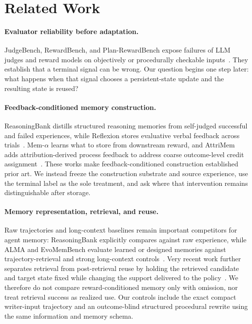 \section{Related Work}
\paragraph{Evaluator reliability before adaptation.}
JudgeBench, RewardBench, and Plan-RewardBench expose failures of LLM judges and reward models on objectively or procedurally checkable inputs~\citep{tan2025judgebench,lambert2024rewardbench,wang2026planrewardbench}. They establish that a terminal signal can be wrong. Our question begins one step later: what happens when that signal chooses a persistent-state update and the resulting state is reused?

\paragraph{Feedback-conditioned memory construction.}
ReasoningBank distills structured reasoning memories from self-judged successful and failed experiences, while Reflexion stores evaluative verbal feedback across trials~\citep{ouyang2026reasoningbank,shinn2023reflexion}. Mem-$\alpha$ learns what to store from downstream reward, and AttriMem adds attribution-derived process feedback to address coarse outcome-level credit assignment~\citep{wang2025memalpha,li2026attrimem}. These works make feedback-conditioned construction established prior art. We instead freeze the construction substrate and source experience, use the terminal label as the sole treatment, and ask where that intervention remains distinguishable after storage.

\paragraph{Memory representation, retrieval, and reuse.}
Raw trajectories and long-context baselines remain important competitors for agent memory: ReasoningBank explicitly compares against raw experience, while ALMA and EvoMemBench evaluate learned or designed memories against trajectory-retrieval and strong long-context controls~\citep{ouyang2026reasoningbank,xiong2026alma,wang2026evomembench}. Very recent work further separates retrieval from post-retrieval reuse by holding the retrieved candidate and target state fixed while changing the support delivered to the policy~\citep{li2026beyondretrieval}. We therefore do not compare reward-conditioned memory only with omission, nor treat retrieval success as realized use. Our controls include the exact compact writer-input trajectory and an outcome-blind structured procedural rewrite using the same information and memory schema.

